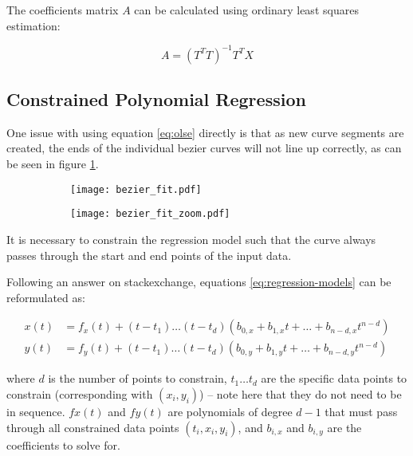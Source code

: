 The coefficients matrix $A$ can be calculated using ordinary least squares estimation:

\begin{equation}
    A = (T^T T)^{-1} T^T X
    \label{eq:olse}
\end{equation}

\subsection{Constrained Polynomial Regression}

One issue with using equation \ref{eq:olse} directly is that as new curve segments are created, the ends of the individual bezier curves will not line up correctly, as can be seen in figure \ref{fig:bezier_fit}.

\begin{figure}
    \centering
    \begin{subfigure}{.45\linewidth}
        \centering
        \texttt{[image: bezier\_fit.pdf]}
        \caption{}
    \end{subfigure}
        \begin{subfigure}{.45\linewidth}
        \centering
        \texttt{[image: bezier\_fit\_zoom.pdf]}
        \caption{}
    \end{subfigure}
    \caption{}
    \label{fig:bezier_fit}
\end{figure}

It is necessary to constrain the regression model such that the curve always passes through the start and end points of the input data.

Following an answer on stackexchange\cite{web:constrained-regression}, equations \ref{eq:regression-models} can be reformulated as:

\begin{align}
    x(t) &= f_x(t) + (t-t_1)\ldots(t-t_d)(b_{0,x} + b_{1,x} t + \ldots + b_{n-d,x} t^{n-d}) \\
    y(t) &= f_y(t) + (t-t_1)\ldots(t-t_d)(b_{0,y} + b_{1,y} t + \ldots + b_{n-d,y} t^{n-d})
\end{align}

where $d$ is the number of points to constrain, $t_1 \ldots t_d$ are the specific data points to constrain (corresponding with $(x_i,y_i)$) -- note here that they do not need to be in sequence. $fx(t)$ and $fy(t)$ are polynomials of degree $d-1$ that must pass through all constrained data points $(t_i,x_i,y_i)$, and $b_{i,x}$ and $b_{i,y}$ are the coefficients to solve for.

